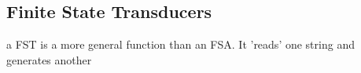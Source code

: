 \documentclass[]{article}
\begin{document}
\subsection{Finite State Transducers}

a FST is a more general function than an FSA. It 'reads' one string and generates another




\end{document}
